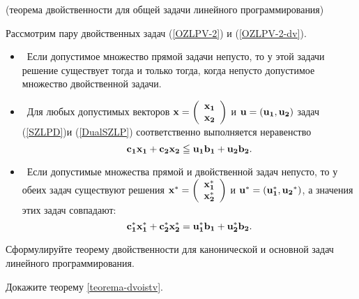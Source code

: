     \begin{teop} \label{teorema-dvoistv} (теорема двойственности для общей
    задачи линейного программирования)

    Рассмотрим пару двойственных задач (\ref{OZLPV-2}) и
    (\ref{OZLPV-2-dv}).
\begin{itemize}
    \item [$1)$\ ] \
    Если допустимое множество прямой задачи непусто, то у этой
    задачи решение существует тогда и только тогда, когда непусто
    допустимое множество двойственной задачи.
    \item [$2)$\ ] \
    Для любых допустимых векторов $\mathbf{x}=\left(
                                            \begin{array}{c}
                                              \mathbf{x_{1}} \\
                                              \mathbf{x_{2}} \\
                                            \end{array}
                                          \right)$
    и $\mathbf{u}=(\mathbf{u_{1}},\mathbf{u_{2}})$
    задач (\ref{SZLPD})и
    (\ref{DualSZLP}) соответственно выполняется неравенство
    \[\mathbf{c_{1}}\mathbf{x_{1}}+\mathbf{c_{2}}\mathbf{x_{2}}\leqq\mathbf{u_{1}}\mathbf{b_{1}}+\mathbf{u_{2}}\mathbf{b_{2}}.\]
    \item [$3)$\ ] \
    Если допустимые множества прямой и двойственной задач непусто,
    то у обеих задач существуют решения $\mathbf{x^{*}}=\left(
                                            \begin{array}{c}
                                              \mathbf{x_{1}^{*}} \\
                                              \mathbf{x_{2}^{*}} \\
                                            \end{array}
                                          \right)$
    и $\mathbf{u^{*}}=(\mathbf{u_{1}^{*}},\mathbf{u_{2}}^{*})$, а значения этих задач совпадают:
    \[\mathbf{c_{1}^{*}}\mathbf{x^{*}_{1}}+\mathbf{c_{2}^{*}}\mathbf{x^{*}_{2}}
    =\mathbf{u^{*}_{1}}\mathbf{b_{1}}+\mathbf{u^{*}_{2}}\mathbf{b_{2}}.\]
\end{itemize}
\end{teop}

\begin{exer}
    Сформулируйте теорему двойственности для канонической и основной
    задач линейного программирования.
\end{exer}
\begin{exer}
    Докажите теорему \ref{teorema-dvoistv}.
\end{exer}







\
